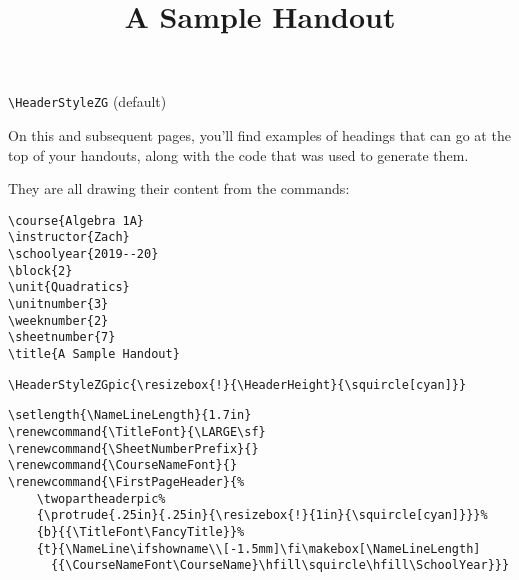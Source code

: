 \documentclass[12pt,twoside,parskip,notitle]{handout}
\title{A Sample Handout}
\begin{document}
\begingroup
\HeaderStyleZG
\maketitle
\verb|\HeaderStyleZG| (default)
\endgroup

\vfill
On this and subsequent pages, you'll find examples of headings that can go at the top of your handouts, along with the code that was used to generate them.

They are all drawing their content from the commands:
\begingroup
\singlespacing
\begin{verbatim}
\course{Algebra 1A}
\instructor{Zach}
\schoolyear{2019--20}
\block{2}
\unit{Quadratics}
\unitnumber{3}
\weeknumber{2}
\sheetnumber{7}
\title{A Sample Handout}
\end{verbatim}
\endgroup

\newpage

\begingroup
\HeaderStyleZGpic{\resizebox{!}{\HeaderHeight}{\squircle[cyan]}}
\maketitle
\verb|\HeaderStyleZGpic{\resizebox{!}{\HeaderHeight}{\squircle[cyan]}}|
\endgroup

\newpage

\begingroup
\setlength{\NameLineLength}{1.7in}
\renewcommand{\TitleFont}{\LARGE\sf}
\renewcommand{\SheetNumberPrefix}{}
\renewcommand{\CourseNameFont}{}
\renewcommand{\FirstPageHeader}{%
	\twopartheaderpic%
	{\protrude{.25in}{.25in}{\resizebox{!}{1in}{\squircle[cyan]}}}%
	{b}{{\TitleFont\FancyTitle}}%
	{t}{\NameLine\ifshowname\\[-1.5mm]\fi\makebox[\NameLineLength]{{\CourseNameFont\CourseName}\hfill\squircle\hfill\SchoolYear}}}
\maketitle
\singlespacing
\begin{verbatim}
\setlength{\NameLineLength}{1.7in}
\renewcommand{\TitleFont}{\LARGE\sf}
\renewcommand{\SheetNumberPrefix}{}
\renewcommand{\CourseNameFont}{}
\renewcommand{\FirstPageHeader}{%
    \twopartheaderpic%
    {\protrude{.25in}{.25in}{\resizebox{!}{1in}{\squircle[cyan]}}}%
    {b}{{\TitleFont\FancyTitle}}%
    {t}{\NameLine\ifshowname\\[-1.5mm]\fi\makebox[\NameLineLength]
      {{\CourseNameFont\CourseName}\hfill\squircle\hfill\SchoolYear}}}
\end{verbatim}
\endgroup
\end{document}
